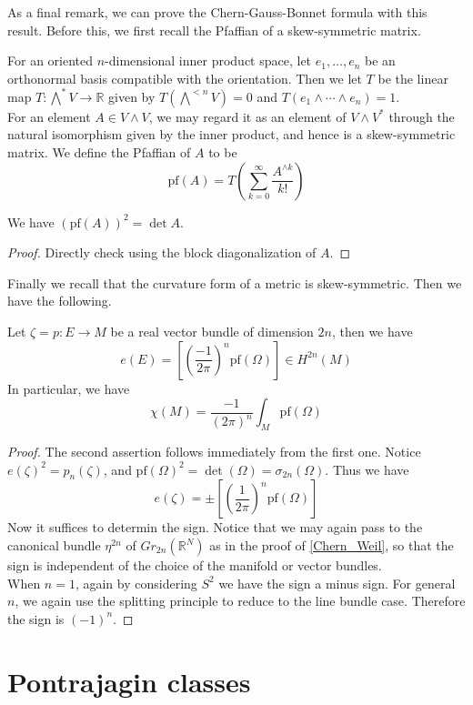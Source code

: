 	As a final remark, we can prove the Chern-Gauss-Bonnet formula with this result. Before this, we first recall the Pfaffian of a skew-symmetric matrix. 
	\begin{defn}
		For an oriented $n$-dimensional inner product space, let $e_1,\dots,e_n$ be an orthonormal basis compatible with the orientation. Then we let $T$ be the linear map $T:\bigwedge^*V\to\mathbb{R}$ given by $T(\bigwedge^{<n}V)=0$ and $T(e_1\wedge\cdots\wedge e_n)=1$. \\
		For an element $A\in V\wedge V$, we may regard it as an element of $V\wedge V^*$ through the natural isomorphism given by the inner product, and hence is a skew-symmetric matrix. We define the Pfaffian of $A$ to be 
		\[ \mathrm{pf}(A)=T(\sum_{k=0}^\infty\frac{A^{\wedge k}}{k!}) \]
	\end{defn}
	\begin{prop}
		We have $(\mathrm{pf}(A))^2=\det A$. 
	\end{prop}
	\begin{proof}
		Directly check using the block diagonalization of $A$. 
	\end{proof}
	Finally we recall that the curvature form of a metric is skew-symmetric. Then we have the following. 
	\begin{thm}\label{Chern_Gauss_Bonnet}
		Let $\zeta=p:E\to M$ be a real vector bundle of dimension $2n$, then we have 
		\[ e(E)=[(\frac{-1}{2\pi})^n\mathrm{pf}(\Omega)]\in H^{2n}(M) \]
		In particular, we have
		\[ \chi(M)=\frac{-1}{(2\pi)^n}\int_M\mathrm{pf}(\Omega) \]
	\end{thm}
	\begin{proof}
		The second assertion follows immediately from the first one. Notice $e(\zeta)^2=p_n(\zeta)$, and $\mathrm{pf}(\Omega)^2=\det(\Omega)=\sigma_{2n}(\Omega)$. Thus we have 
		\[ e(\zeta)=\pm\left[\left(\frac{1}{2\pi}\right)^n\mathrm{pf}(\Omega)\right] \]
		Now it suffices to determin the sign. Notice that we may again pass to the canonical bundle $\eta^{2n}$ of $Gr_{2n}(\mathbb{R}^N)$ as in the proof of \cref{Chern_Weil}, so that the sign is independent of the choice of the manifold or vector bundles. \\
		When $n=1$, again by considering $S^2$ we have the sign a minus sign. For general $n$, we again use the splitting principle to reduce to the line bundle case. Therefore the sign is $(-1)^n$. 
	\end{proof}

\section{Pontrajagin classes}

